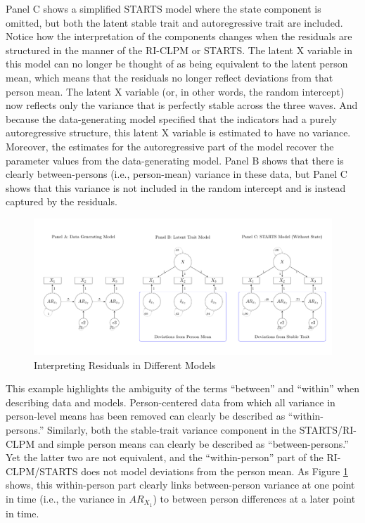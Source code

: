 \documentclass[
  english,
  man,floatsintext]{apa6}
\begin{document}
Panel C shows a simplified STARTS model where the state component is omitted, but both the latent stable trait and autoregressive trait are included. Notice how the interpretation of the components changes when the residuals are structured in the manner of the RI-CLPM or STARTS. The latent X variable in this model can no longer be thought of as being equivalent to the latent person mean, which means that the residuals no longer reflect deviations from that person mean. The latent X variable (or, in other words, the random intercept) now reflects only the variance that is perfectly stable across the three waves. And because the data-generating model specified that the indicators had a purely autoregressive structure, this latent X variable is estimated to have no variance. Moreover, the estimates for the autoregressive part of the model recover the parameter values from the data-generating model. Panel B shows that there is clearly between-persons (i.e., person-mean) variance in these data, but Panel C shows that this variance is not included in the random intercept and is instead captured by the residuals.

\begin{figure}
\centering
\includegraphics{images/betweenExample.pdf}
\caption{\label{fig:betweenFig}Interpreting Residuals in Different Models}
\end{figure}

This example highlights the ambiguity of the terms ``between'' and ``within'' when describing data and models. Person-centered data from which all variance in person-level means has been removed can clearly be described as ``within-persons.'' Similarly, both the stable-trait variance component in the STARTS/RI-CLPM and simple person means can clearly be described as ``between-persons.'' Yet the latter two are not equivalent, and the ``within-person'' part of the RI-CLPM/STARTS does not model deviations from the person mean. As Figure \ref{fig:betweenFig} shows, this within-person part clearly links between-person variance at one point in time (i.e., the variance in \(AR_{X_1}\)) to between person differences at a later point in time.
\end{document}
